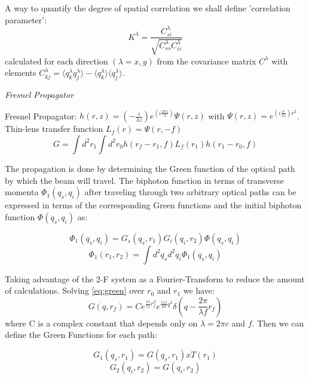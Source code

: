 A way to quantify the degree of spatial correlation we shall define 'correlation parameter':
\begin{equation}
K^\lambda = \frac{C^\lambda_{si}}{\sqrt{C^\lambda_{ss}C^\lambda_{ii}}}
\end{equation}
calculated for each direction $(\lambda = x, y)$ from the covariance matrix $C^\lambda$ with elements $C^\lambda_{kj} = \langle q^\lambda_k q^\lambda_j \rangle - \langle q^\lambda_k \rangle \langle q^\lambda_j \rangle $.


\textit{Fresnel Propagator}


Fresnel Propagator: $h(r,z)=(- \frac{i}{\lambda z})e^{(i \frac{2 \pi z}{\lambda})} \Psi (r,z)$ 
with $\Psi(r,z) = e^{(i \frac{\pi}{\lambda z })r^2}$. Thin-lens transfer function $L_f (r)=\Psi(r,-f)$
 \\
\begin{equation}\label{eq:green}
G= \int d^2 r_1 \int d^2 r_0 h(r_f - r_1,f) L_f(r_1) h(r_1 - r_0,f)
\end{equation}

The propagation is done by determining the Green function\cite{green} of the optical path
by which the beam will travel. The biphoton function
in terms of transverse momenta $\Phi_1 (q_s , q_i )$ after traveling
through two arbitrary optical paths can be expressed
in terms of the corresponding Green functions and the
initial biphoton function $\Phi(q_s , q_i )$ as:

\begin{equation}
\Phi_1 (q_s , q_i )= G_s(q_s,r_1) G_i(q_i,r_2) \Phi (q_s,q_i) 
\end{equation}
\begin{equation}
\Phi_1 (r_1 , r_2 )= \int d^2 q_s d^2 q_i \Phi_1 (q_s , q_i ) 
\end{equation}

Taking advantage of the 2-F system as a Fourier-Transform to reduce the amount of calculations. Solving \ref{eq:green} over $r_0$ and $r_1$ we have:
\begin{equation}
G(q,r_f)=C e^{\frac{i \pi}{\lambda f} r_f^2} e^{\frac{i \lambda f}{4 \pi} q^2} \delta ( q - \frac{2 \pi}{\lambda f}r_f)
\end{equation}
where C is a complex constant that depends only on $\lambda = 2\pi c$ and $f$. Then we can define the Green Functions for each path:

\begin{equation}
G_1(q_s,r_1)=G(q_s,r_1) x T(r_1) 
\end{equation}
\begin{equation}
G_2(q_i,r_2)=G(q_i,r_2)
\end{equation}

